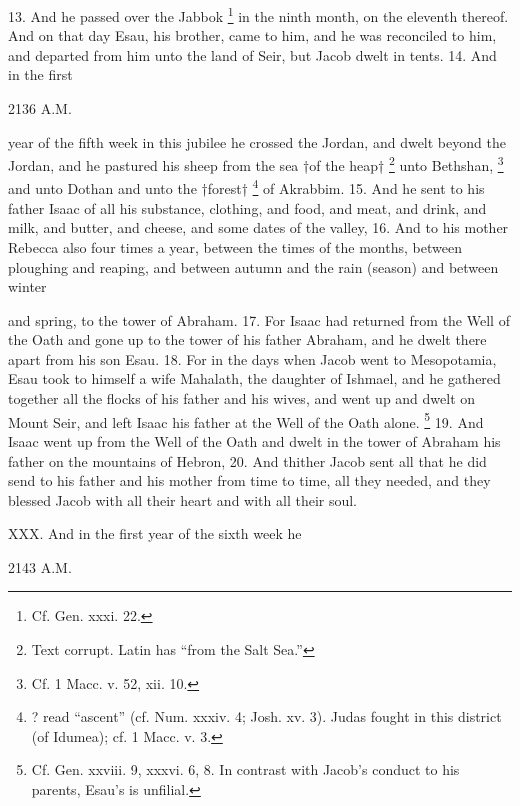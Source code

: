 
13. And he passed over the Jabbok \footnote{Cf. Gen. xxxi. 22.} in the ninth month, on the eleventh thereof. And on that day Esau, his brother, came to him, and he was reconciled to him, and departed from him unto the land of Seir, but Jacob dwelt in tents. 14. And in the first

2136 A.M.

year of the fifth week in this jubilee he crossed the Jordan, and dwelt beyond the Jordan, and he pastured his sheep from the sea †of the heap† \footnote{Text corrupt. Latin has ``from the Salt Sea.''} unto Bethshan, \footnote{Cf. 1 Macc. v. 52, xii. 10.} and unto Dothan and unto the †forest† \footnote{? read ``ascent'' (cf. Num. xxxiv. 4; Josh. xv. 3). Judas fought in this district (of Idumea); cf. 1 Macc. v. 3.} of Akrabbim. 15. And he sent to his father Isaac of all his substance, clothing, and food, and meat, and drink, and milk, and butter, and cheese, and some dates of the valley, 16. And to his mother Rebecca also four times a year, between the times of the months, between ploughing and reaping, and between autumn and the rain (season) and between winter

and spring, to the tower of Abraham. 17. For Isaac had returned from the Well of the Oath and gone up to the tower of his father Abraham, and he dwelt there apart from his son Esau. 18. For in the days when Jacob went to Mesopotamia, Esau took to himself a wife Mahalath, the daughter of Ishmael, and he gathered together all the flocks of his father and his wives, and went up and dwelt on Mount Seir, and left Isaac his father at the Well of the Oath alone. \footnote{Cf. Gen. xxviii. 9, xxxvi. 6, 8. In contrast with Jacob's conduct to his parents, Esau's is unfilial.} 19. And Isaac went up from the Well of the Oath and dwelt in the tower of Abraham his father on the mountains of Hebron, 20. And thither Jacob sent all that he did send to his father and his mother from time to time, all they needed, and they blessed Jacob with all their heart and with all their soul.


XXX. And in the first year of the sixth week he

2143 A.M.

